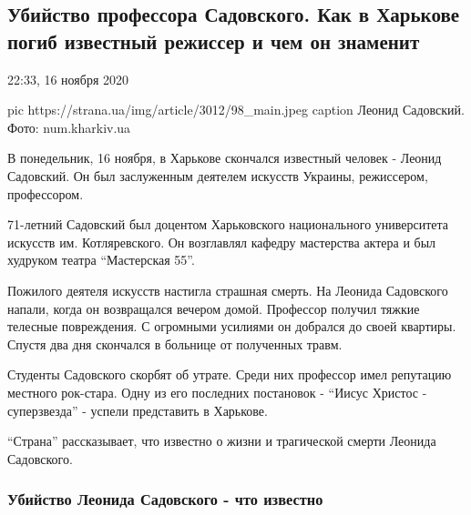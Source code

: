  
 
 
 
\subsection{Убийство профессора Садовского. Как в Харькове погиб известный режиссер и чем он знаменит}

22:33, 16 ноября 2020

\ifcmt
pic https://strana.ua/img/article/3012/98_main.jpeg
caption Леонид Садовский. Фото: num.kharkiv.ua
\fi

В понедельник, 16 ноября, в Харькове скончался известный человек - Леонид
Садовский.
Он был заслуженным деятелем искусств Украины, режиссером, профессором.

71-летний Садовский был доцентом Харьковского национального университета
искусств им. Котляревского. Он возглавлял кафедру мастерства актера и был
худруком театра \enquote{Мастерская 55}.

Пожилого деятеля искусств настигла страшная смерть. На Леонида Садовского
напали, когда он возвращался вечером домой. Профессор получил тяжкие
телесные повреждения. С огромными усилиями он добрался до своей квартиры.
Спустя два дня скончался в больнице от полученных травм. 

Студенты Садовского скорбят об утрате. Среди них профессор имел репутацию
местного рок-стара. Одну из его последних постановок - \enquote{Иисус Христос -
суперзвезда} - успели представить в Харькове. 

\enquote{Страна} рассказывает, что известно о жизни и трагической смерти Леонида
Садовского. 

\subsubsection{Убийство Леонида Садовского - что известно }

